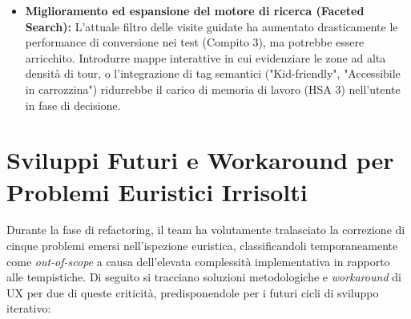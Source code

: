 \begin{itemize}
    \item \textbf{Miglioramento ed espansione del motore di ricerca (Faceted Search):}
    L'attuale filtro delle visite guidate ha aumentato drasticamente le performance di conversione nei test (Compito 3), ma potrebbe essere arricchito. Introdurre mappe interattive in cui evidenziare le zone ad alta densità di tour, o l'integrazione di tag semantici ("Kid-friendly", "Accessibile in carrozzina") ridurrebbe il carico di memoria di lavoro (HSA 3) nell'utente in fase di decisione.

\end{itemize}

\section{Sviluppi Futuri e Workaround per Problemi Euristici Irrisolti}
Durante la fase di refactoring, il team ha volutamente tralasciato la correzione di cinque problemi emersi nell'ispezione euristica, classificandoli temporaneamente come \textit{out-of-scope} a causa dell'elevata complessità implementativa in rapporto alle tempistiche. Di seguito si tracciano soluzioni metodologiche e \textit{workaround} di UX per due di queste criticità, predisponendole per i futuri cicli di sviluppo iterativo:

